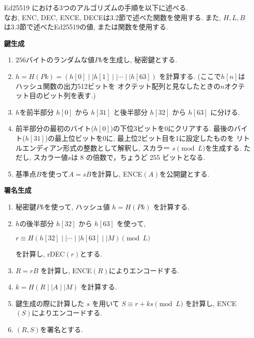 Ed25519 における3つのアルゴリズムの手順を以下に述べる.\\
\indent なお, ENC, DEC, ENCE, DECEは3.2節で述べた関数を使用する.
また, $H, L, B$は3.3節で述べたEd25519の値, または関数を使用する.\\[1em]
\let\ltxlist\list
\begin{breakitembox}[l]{\textbf{鍵生成}}
  　
  \begin{enumerate}[parsep=7pt]
    \item $256$バイトのランダムな値$Pk$を生成し, 秘密鍵とする.
    \item $h=H(Pk)=(h[0]\mid\mid h[1]\mid\mid \cdots\mid\mid h[63])$
    を計算する. (ここで$h[n]$はハッシュ関数の出力512ビットを
    オクテット配列と見なしたときの$n$オクテット目のビット列を表す.)
    \item $h$を前半部分 $h[0]$ から $h[31]$ と後半部分 $h[32]$ から $h[63]$ に分ける.
    \item 前半部分の最初のバイト($h[0]$)の下位3ビットを0にクリアする.
    最後のバイト($h[31]$)の最上位ビットを0に, 最上位2ビット目を1に設定したものを
    リトルエンディアン形式の整数として解釈し, スカラー $s \pmod L$を生成する. 
    ただし, スカラー値$s$は 8 の倍数で，ちょうど 255 ビットとなる.
    \item 基準点$B$を使って$A = sB$を計算し, ENCE$(A)$を公開鍵とする. 
  \end{enumerate}
\end{breakitembox}
\vspace{2em}
\let\ltxlist\list
\begin{breakitembox}[l]{\textbf{署名生成}}
  　
  \begin{enumerate}[parsep=7pt]
    \item 秘密鍵$Pk$を使って, ハッシュ値 $h=H(Pk)$ を計算する.
    \item $h$の後半部分 $h[32]$ から $h[63]$ を使って, 
    \begin{center}
      $r \equiv H(h[32]\mid\mid \cdots \mid\mid h[63] \mid\mid M) \pmod L$
    \end{center}
    を計算し, r\leftarrow DEC$(r)$とする.
    \item $R=rB$ を計算し, ENCE$(R)$によりエンコードする.
    \item $k=H(R \mid\mid A \mid\mid M)$ を計算する.
    \item 鍵生成の際に計算した $s$ を用いて $S\equiv r+ks \pmod L$ を計算し, ENCE$(S)$によりエンコードする.
    \item $(R,S)$を署名とする.
  \end{enumerate}
\end{breakitembox}
